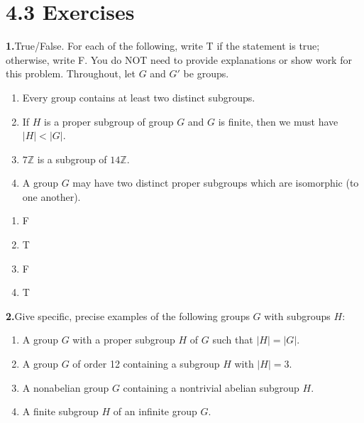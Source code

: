 \documentclass[10pt,]{book}
\theoremstyle{plain}
\theoremstyle{definition}
\theoremstyle{definition}
\theoremstyle{definition}
\theoremstyle{definition}
\numberwithin{equation}{section}
\def\Z{\mathbb{Z}}
\newcommand{\lt}{<}
\begin{document}
\section*{4.3 Exercises}
\noindent\textbf{1.}\quad{}True/False. For each of the following, write T if the statement is true; otherwise, write F. You do NOT need to provide explanations or show work for this problem. Throughout, let \(G\) and \(G'\) be groups. \leavevmode%
\begin{enumerate}[label=(\alph*)]
\item\hypertarget{li-212}{}Every group contains at least two distinct subgroups.%
\item\hypertarget{li-213}{}If \(H\) is a proper subgroup of group \(G\) and \(G\) is finite, then we must have \(|H|\lt |G|\).%
\item\hypertarget{li-214}{}\(7\Z\) is a subgroup of \(14\Z\).%
\item\hypertarget{li-215}{}A group \(G\) may have two distinct proper subgroups which are isomorphic (to one another).%
\end{enumerate}
%
\par\smallskip
\leavevmode%
\begin{multicols}{4}
\begin{enumerate}[label=(\alph*)]
\item\hypertarget{li-216}{}F%
\item\hypertarget{li-217}{}T%
\item\hypertarget{li-218}{}F%
\item\hypertarget{li-219}{}T%
\end{enumerate}
\end{multicols}
\par\smallskip
\noindent\textbf{2.}\quad{}Give specific, precise examples of the following groups \(G\) with subgroups \(H\): \leavevmode%
\begin{enumerate}[label=(\alph*)]
\item\hypertarget{li-220}{}A group \(G\) with a proper subgroup \(H\) of \(G\) such that \(|H|=|G|\).%
\item\hypertarget{li-221}{}A group \(G\) of order 12 containing a subgroup \(H\) with \(|H|=3\).%
\item\hypertarget{li-222}{}A nonabelian group \(G\) containing a nontrivial abelian subgroup \(H\).%
\item\hypertarget{li-223}{}A finite subgroup \(H\) of an infinite group \(G\).%
\end{enumerate}
%
\par\smallskip
\end{document}
